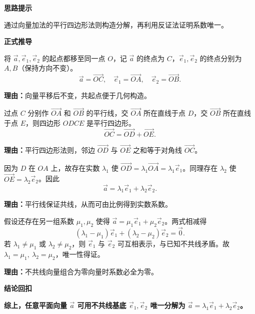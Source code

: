 \begin{proofbox}
	\textbf{\textcolor{CProof}{思路提示}}
	\par 通过向量加法的平行四边形法则构造分解，再利用反证法证明系数唯一。

	\medskip
	\textbf{\textcolor{CProof}{正式推导}}
	\begin{description}[style=nextline, leftmargin=2.8em, labelsep=0.5em, itemsep=0.55em]
		\item[\textbf{步骤一（平移共起点）：}]
			将 $\vec{a},\vec{e}_1,\vec{e}_2$ 的起点都移至同一点 $O$，记 $\vec{a}$ 的终点为 $C$，$\vec{e}_1,\vec{e}_2$ 的终点分别为 $A,B$（保持方向不变）。
			\[
				\vec{a} = \overrightarrow{OC},\quad \vec{e}_1 = \overrightarrow{OA},\quad \vec{e}_2 = \overrightarrow{OB}.
			\]
			\par\textbf{理由：}向量平移后不变，共起点便于几何构造。
		\item[\textbf{步骤二（作平行四边形）：}]
			过点 $C$ 分别作 $\overrightarrow{OA}$ 和 $\overrightarrow{OB}$ 的平行线，交 $\overrightarrow{OA}$ 所在直线于点 $D$，交 $\overrightarrow{OB}$ 所在直线于点 $E$，则四边形 $ODCE$ 是平行四边形。
			\[
				\overrightarrow{OC} = \overrightarrow{OD} + \overrightarrow{OE}.
			\]
			\par\textbf{理由：}平行四边形法则，邻边 $\overrightarrow{OD}$ 与 $\overrightarrow{OE}$ 之和等于对角线 $\overrightarrow{OC}$。
		\item[\textbf{步骤三（确定系数）：}]
			因为 $D$ 在 $OA$ 上，故存在实数 $\lambda_1$ 使 $\overrightarrow{OD} = \lambda_1\overrightarrow{OA} = \lambda_1\vec{e}_1$。同理存在 $\lambda_2$ 使 $\overrightarrow{OE} = \lambda_2\vec{e}_2$。因此
			\[
				\vec{a} = \lambda_1\vec{e}_1 + \lambda_2\vec{e}_2.
			\]
			\par\textbf{理由：}平行线保证共线，从而可由比例得到实数系数。
		\item[\textbf{步骤四（唯一性证明）：}]
			假设还存在另一组系数 $\mu_1,\mu_2$ 使得 $\vec{a} = \mu_1\vec{e}_1 + \mu_2\vec{e}_2$。两式相减得
			\[
				(\lambda_1 - \mu_1)\vec{e}_1 + (\lambda_2 - \mu_2)\vec{e}_2 = \vec{0}.
			\]
			若 $\lambda_1\neq\mu_1$ 或 $\lambda_2\neq\mu_2$，则 $\vec{e}_1$ 与 $\vec{e}_2$ 可互相表示，与已知不共线矛盾。故 $\lambda_1=\mu_1,\ \lambda_2=\mu_2$，唯一性得证。
			\par\textbf{理由：}不共线向量组合为零向量时系数必全为零。
	\end{description}

	\medskip
	\textbf{\textcolor{CProof}{结论回扣}}
	\par\textbf{综上，任意平面向量 $\vec{a}$ 可用不共线基底 $\vec{e}_1,\vec{e}_2$ 唯一分解为 $\vec{a}=\lambda_1\vec{e}_1+\lambda_2\vec{e}_2$。}
\end{proofbox}
